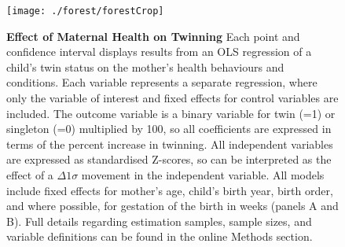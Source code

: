 \documentclass{nature}
\begin{document}
\begin{linenumbers}
\begin{spacing}{1}
\clearpage
\thispagestyle{empty}
\begin{spacing}{1}
\begin{figure}
\begin{center}
  \texttt{[image: ./forest/forestCrop]}
\end{center}
\caption{\textbf{Effect of Maternal Health on Twinning} {\footnotesize Each point and confidence interval displays results from an OLS regression of a child's twin status on the mother's health behaviours and conditions. Each variable represents a separate regression, where only the variable of interest and fixed effects for control variables are included. The outcome variable is a binary variable for twin (=1) or singleton (=0) multiplied by 100, so all coefficients are expressed in terms of the percent increase in twinning.  All independent variables are expressed as standardised Z-scores, so can be interpreted as the effect of a $\Delta 1\sigma$ movement in the independent variable. All models include fixed effects for mother's age, child's birth year, birth order, and where possible, for gestation of the birth in weeks (panels A and B).  Full details regarding estimation samples, sample sizes, and variable definitions can be found in the online Methods section.}}
\label{fig:fullEsts}
\end{figure}
\end{spacing}


\clearpage
\thispagestyle{empty}









\end{spacing}
\end{linenumbers}
\end{document}
